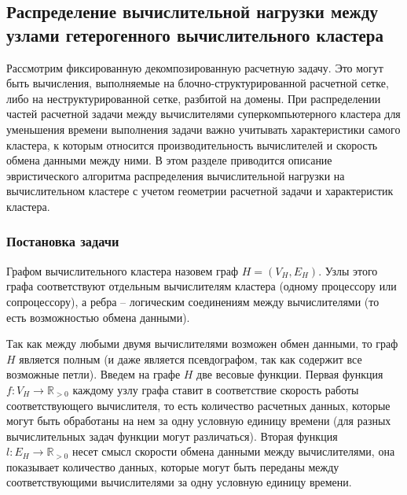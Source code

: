 \subsection{Распределение вычислительной нагрузки между \\ узлами гетерогенного вычислительного кластера}\label{sec:text_2_getero}

\label{term:cluster_getero}Рассмотрим фиксированную декомпозированную расчетную задачу.
Это могут быть вычисления, выполняемые на блочно-структурированной расчетной сетке, либо на неструктурированной сетке, разбитой на домены.
При распределении частей расчетной задачи между вычислителями суперкомпьютерного кластера для уменьшения времени выполнения задачи важно учитывать характеристики самого кластера, к которым относится производительность вычислителей и скорость обмена данными между ними.
В этом разделе приводится описание эвристического алгоритма распределения вычислительной нагрузки на вычислительном кластере с учетом геометрии расчетной задачи и характеристик кластера.

\subsubsection{Постановка задачи}

\begin{definition}
Графом вычислительного кластера\label{term:graph_cluster} назовем граф $H = (V_H, E_H)$.
Узлы этого графа соответствуют отдельным вычислителям кластера (одному процессору или сопроцессору), а ребра -- логическим соединениям между вычислителями (то есть возможностью обмена данными).
\end{definition}

Так как между любыми двумя вычислителями возможен обмен данными, то граф $H$ является полным (и даже является псевдографом, так как содержит все возможные петли).
Введем на графе $H$ две весовые функции.
Первая функция $f: V_H \rightarrow \mathbb{R}_{> 0}$ каждому узлу графа ставит в соответствие скорость работы соответствующего вычислителя, то есть количество расчетных данных, которые могут быть обработаны на нем за одну условную единицу времени (для разных вычислительных задач функции могут различаться).
Вторая функция $l: E_H \rightarrow \mathbb{R}_{> 0}$ несет смысл скорости обмена данными между вычислителями, она показывает количество данных, которые могут быть переданы между соответствующими вычислителями за одну условную единицу времени.

